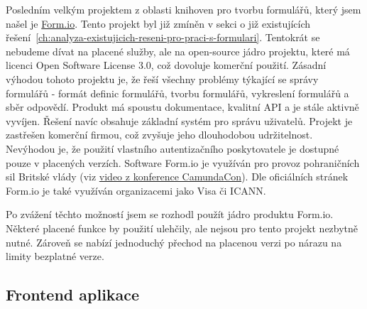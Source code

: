 Posledním velkým projektem z oblasti knihoven pro tvorbu formulářů, který jsem našel je \href{https://form.io/}{Form.io}.
Tento projekt byl již zmíněn v sekci o již existujících řešení\ \ref{ch:analyza-existujicich-reseni-pro-praci-s-formulari}.
Tentokrát se nebudeme dívat na placené služby, ale na open-source jádro projektu, které má licenci Open Software License 3.0, což dovoluje komerční použití.
Zásadní výhodou tohoto projektu je, že řeší všechny problémy týkající se správy formulářů - formát definic formulářů, tvorbu formulářů, vykreslení formulářů a sběr odpovědí.
Produkt má spoustu dokumentace, kvalitní API a je stále aktivně vyvíjen.
Řešení navíc obsahuje základní systém pro správu uživatelů.
Projekt je zastřešen komerční firmou, což zvyšuje jeho dlouhodobou udržitelnost.
Nevýhodou je, že použití vlastního autentizačního poskytovatele je dostupné pouze v placených verzích.
Software Form.io je využíván pro provoz pohraničních sil Britské vlády (viz \href{https://www.youtube.com/watch?v=nuf46N5vU34}{video z konference CamundaCon}).
Dle oficiálních stránek Form.io je také využíván organizacemi jako Visa či ICANN\@.

Po zvážení těchto možností jsem se rozhodl použít jádro produktu Form.io.
Některé placené funkce by použití ulehčily, ale nejsou pro tento projekt nezbytně nutné.
Zároveň se nabízí jednoduchý přechod na placenou verzi po nárazu na limity bezplatné verze.

\subsection{Frontend aplikace}\label{subsec:frontend-aplikace}

